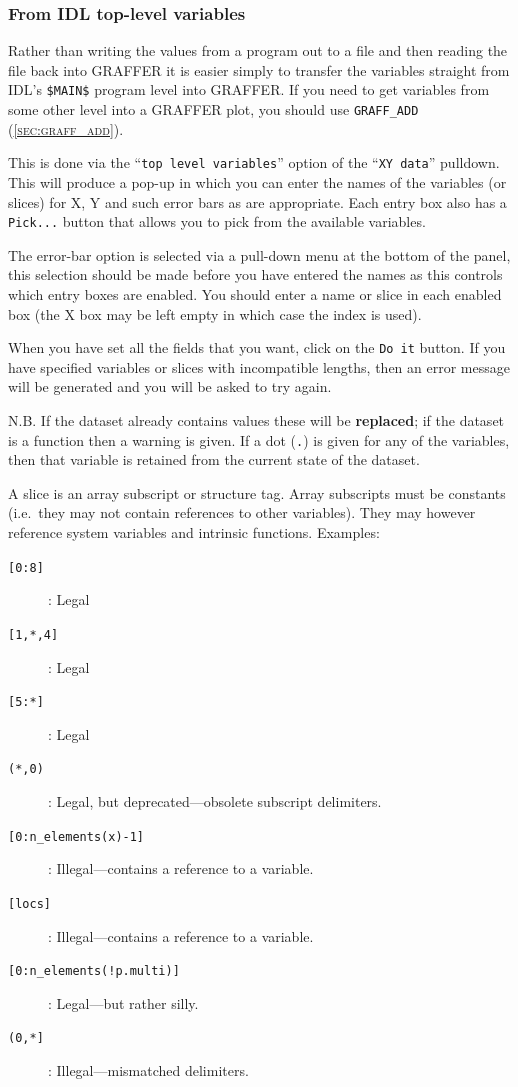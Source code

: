 \documentclass[11pt,twoside,english]{article}
\begin{document}
\subsubsection{From IDL top-level variables }

Rather than writing the values from a program out to a file and then
reading the file back into GRAFFER it is easier simply to transfer the
variables straight from IDL's \texttt{\$MAIN\$} program level into
GRAFFER. If you need to get variables from some other level into a
GRAFFER plot, you should use \texttt{GRAFF\_ADD}
(\textsc{\autoref{sec:graff_add}}). 

This is done via the {}``\texttt{top level variables}'' option of the
{}``\texttt{XY data}'' pulldown. This will produce a pop-up in which
you can enter the names of the variables (or slices) for X, Y and such
error bars as are appropriate. Each entry box also has a
\texttt{Pick...} button that allows you to pick from the available
variables.

The error-bar option is selected via a pull-down menu at the bottom of
the panel, this selection should be made before you have entered the
names as this controls which entry boxes are enabled. You should enter
a name or slice in each enabled box (the X box may be left empty in
which case the index is used).

When you have set all the fields that you want, click on the \texttt{Do
  it} button. If you have specified variables or slices with
incompatible lengths, then an error message will be generated and you
will be asked to try again.

N.B. If the dataset already contains values these will be
\textbf{replaced}; if the dataset is a function then a warning is
given. If a dot (\texttt{.}) is given for any of the variables, then
that variable is retained from the current state of the dataset.

A slice is an array subscript or structure tag. Array subscripts must
be constants (i.e.\ they may not contain references to other
variables). They may however reference system variables and intrinsic
functions. Examples:
\begin{description}
\item [\texttt{[0:8]}] : Legal
\item [\texttt{[1,*,4]}] : Legal
\item [\texttt{[5:*]}] : Legal
\item[\texttt{(*,0)}] : Legal, but deprecated---obsolete subscript
  delimiters.
\item [\texttt{[0:n\_elements(x)-1]}] : Illegal---contains a reference to
  a variable. 
\item [\texttt{[locs]}] : Illegal---contains a reference to a variable.
\item [\texttt{[0:n\_elements(!p.multi)]}] : Legal---but rather silly.
\item [\texttt{(0,*]}] : Illegal---mismatched delimiters.
\end{description}
\end{document}
